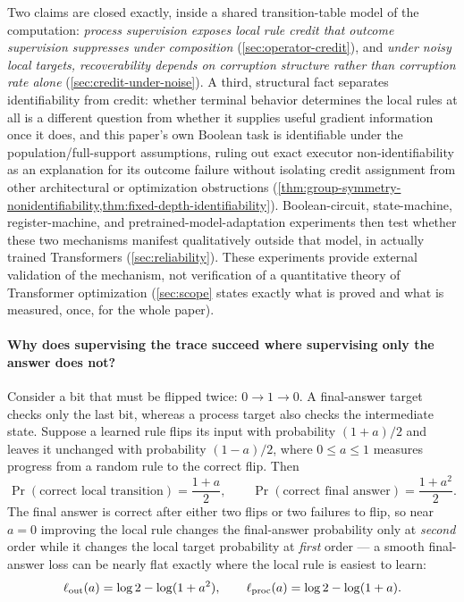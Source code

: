 Two claims are closed exactly, inside a shared transition-table model
of the computation: \emph{process supervision exposes local rule credit
that outcome supervision suppresses under composition}
(\cref{sec:operator-credit}), and \emph{under noisy local targets,
recoverability depends on corruption structure rather than corruption rate
alone} (\cref{sec:credit-under-noise}). A third, structural fact separates
identifiability from credit: whether terminal behavior determines the
local rules at all is a different question from whether it supplies
useful gradient information once it does, and this paper's own Boolean
task is identifiable under the population/full-support assumptions,
ruling out exact executor non-identifiability as an explanation for its
outcome failure without isolating credit assignment from other
architectural or optimization obstructions
(\cref{thm:group-symmetry-nonidentifiability,thm:fixed-depth-identifiability}).
Boolean-circuit, state-machine,
register-machine, and pretrained-model-adaptation experiments then test
whether these two mechanisms manifest qualitatively outside that model,
in actually trained Transformers (\cref{sec:reliability}). These experiments provide
external validation of the mechanism, not verification of a quantitative
theory of Transformer optimization (\cref{sec:scope} states exactly what
is proved and what is measured, once, for the whole paper).

\paragraph{Why does supervising the trace succeed where supervising only the answer does not?}
Consider a bit that must be flipped twice: $0\to1\to0$. A final-answer target
checks only the last bit, whereas a process target also checks the intermediate
state. Suppose a learned rule flips its input with probability $(1+a)/2$ and
leaves it unchanged with probability $(1-a)/2$, where $0\le a\le1$ measures
progress from a random rule to the correct flip. Then
\begin{equation}
 \Pr(\text{correct local transition})=\frac{1+a}{2},\qquad
 \Pr(\text{correct final answer})=\frac{1+a^2}{2}.
 \label{eq:two-flip-probabilities}
\end{equation}
The final answer is correct after either two flips or two failures to flip, so
near $a=0$ improving the local rule changes the final-answer probability only
at \emph{second} order while it changes the local target probability at
\emph{first} order --- a smooth final-answer loss can be nearly flat exactly
where the local rule is easiest to learn:
\begin{equation}
 \ell_{\rm out}(a)=\log2-\log(1+a^2),
 \qquad
 \ell_{\rm proc}(a)=\log2-\log(1+a).
 \label{eq:two-flip-losses}
\end{equation}

